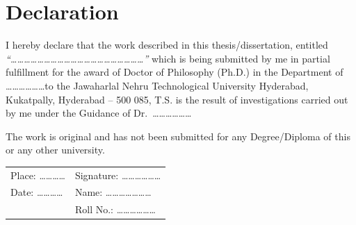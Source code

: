 \chapter*{Declaration}
\thispagestyle{plain}

I hereby declare that the work described in this thesis/dissertation,
entitled \textit{``\ldots\ldots\ldots\ldots\ldots\ldots\ldots\ldots\ldots\ldots\ldots\ldots\ldots\ldots\ldots\ldots\ldots\ldots\ldots\ldots''}
which is being submitted by me in partial fulfillment for the award of
Doctor of Philosophy (Ph.D.) in the Department of
\ldots\ldots\ldots\ldots\ldots\ldots to the Jawaharlal Nehru Technological
University Hyderabad, Kukatpally, Hyderabad -- 500 085, T.S. is the
result of investigations carried out by me under the Guidance of
Dr.\ \ldots\ldots\ldots\ldots\ldots\ldots

The work is original and has not been submitted for any
Degree/Diploma of this or any other university.

\vspace{2cm}

\noindent
\begin{tabular}{ll}
    Place: \ldots\ldots\ldots\ldots & \hspace{4cm} Signature: \ldots\ldots\ldots\ldots\ldots\ldots \\[1.2cm]
    Date: \ldots\ldots\ldots\ldots  & \hspace{4cm} Name: \ldots\ldots\ldots\ldots\ldots\ldots\ldots \\[0.5cm]
                                    & \hspace{4cm} Roll No.: \ldots\ldots\ldots\ldots\ldots\ldots \\
\end{tabular}

\newpage
